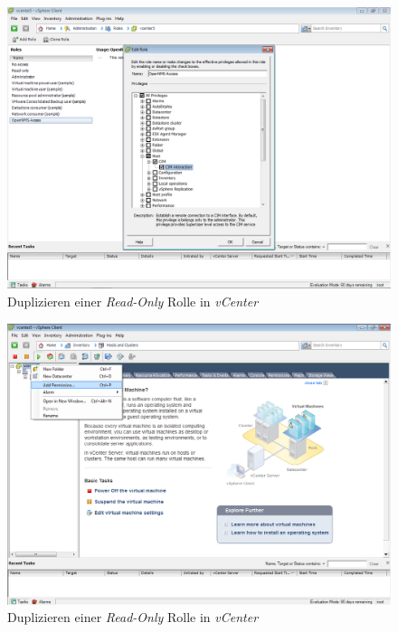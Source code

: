 \begin{figure}[H]
	\centering
	\includegraphics[width=1.0\textwidth]{images/3rd-party/vmware/1-editing}
	\caption{Duplizieren einer \emph{Read-Only} Rolle in \emph{vCenter}}
	\label{pic:vmware-editing}
\end{figure}

\begin{figure}[H]
	\centering
	\includegraphics[width=1.0\textwidth]{images/3rd-party/vmware/2-permission}
	\caption{Duplizieren einer \emph{Read-Only} Rolle in \emph{vCenter}}
	\label{pic:vmware-permission}
\end{figure}

